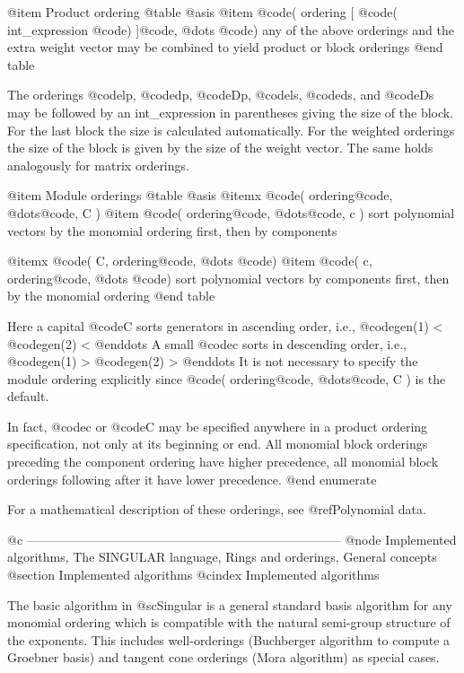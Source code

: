 @item Product ordering
@table @asis
@item @code{(} ordering [ @code{(} int_expression @code{)} ]@code{,} @dots{} @code{)}
any of the above orderings and the extra weight vector may be combined
to yield product or block orderings
@end table

The orderings @code{lp}, @code{dp}, @code{Dp}, @code{ls}, @code{ds}, and
@code{Ds} may be followed by an int_expression in parentheses giving the
size of the block. For the last block the size is calculated
automatically. For the weighted orderings the size of the block is given
by the size of the weight vector. The same holds analogously for matrix
orderings.

@item Module orderings
@table @asis
@itemx @code{(} ordering@code{,} @dots{}@code{, C )}
@item @code{(} ordering@code{,} @dots{}@code{, c )}
sort polynomial vectors by the monomial ordering first, then by
components

@itemx @code{( C,} ordering@code{,} @dots{} @code{)}
@item @code{( c,} ordering@code{,} @dots{} @code{)}
sort polynomial vectors by components first, then by the monomial
ordering
@end table

Here a capital @code{C} sorts generators in ascending order, i.e.,
@code{gen(1)} < @code{gen(2)} < @enddots{} A small @code{c} sorts in
descending order, i.e., @code{gen(1)} > @code{gen(2)} > @enddots{} It is
not necessary to specify the module ordering explicitly since @code{(}
ordering@code{,} @dots{}@code{, C )} is the default.

In fact, @code{c} or @code{C} may be specified anywhere in a product
ordering specification, not only at its beginning or end.  All monomial
block orderings preceding the component ordering have higher precedence,
all monomial block orderings following after it have lower precedence.
@end enumerate

For a mathematical description of these orderings, see
@ref{Polynomial data}.

@c ---------------------------------------------------------------------------
@node Implemented algorithms, The SINGULAR language, Rings and orderings, General concepts
@section Implemented algorithms
@cindex Implemented algorithms

The basic algorithm in @sc{Singular} is a general standard basis algorithm for
any monomial ordering which is compatible with the natural semi-group
structure of the exponents. This includes well-orderings
(Buchberger algorithm to compute a Groebner basis)
and tangent cone orderings (Mora algorithm) as special cases.


